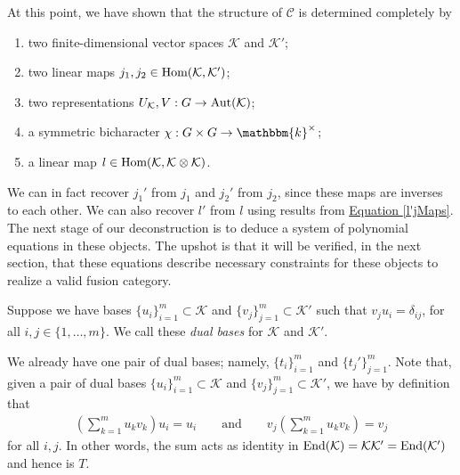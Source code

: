 \noindent At this point, we have shown that the structure of $\mathcal{C}$ is determined completely by
\begin{enumerate}[label=\textup{(\roman*).}, ref=\textup{(\roman*)}, leftmargin=4\parindent]
\item two finite-dimensional vector spaces $\mathcal{K}$ and $\mathcal{K}'$;
\item two linear maps $j_1, j_2 \in \textup{Hom}(\mathcal{K}, \mathcal{K}')$;
\item two representations $U_\mathcal{K}, V : G \to \textup{Aut}(\mathcal{K})$;
\item a symmetric bicharacter $\chi : G \times G \to \mathbbm{k}^\times$;
\item a linear map $l \in \textup{Hom}(\mathcal{K}, \mathcal{K} \otimes \mathcal{K})$.
\end{enumerate}
\noindent We can in fact recover $j_1'$ from $j_1$ and $j_2'$ from $j_2$, since these maps are inverses to each other. We can also recover $l'$ from $l$ using results from \hyperref[l'jMaps]{Equation \eqref*{l'jMaps}}. The next stage of our deconstruction is to deduce a system of polynomial equations in these objects. The upshot is that it will be verified, in the next section, that these equations describe necessary constraints for these objects to realize a valid fusion category.\\

\noindent\begin{definition}\label{DualBasis1} Suppose we have bases $\{u_i\}_{i=1}^m \subset \mathcal{K}$ and $\{v_j\}_{j=1}^m \subset \mathcal{K}'$ such that $v_ju_i = \delta_{ij}$, for all $i, j \in \{1, \dots, m\}$. We call these {\em dual bases} for $\mathcal{K}$ and $\mathcal{K}'$.\\
\end{definition}

\noindent We already have one pair of dual bases; namely, $\{t_i\}_{i=1}^m$ and $\{t_j'\}_{j=1}^m$. Note that, given a pair of dual bases $\{u_i\}_{i=1}^m \subset \mathcal{K}$ and $\{v_j\}_{j=1}^m \subset \mathcal{K}'$, we have by definition that
\begin{align*}
\left(\sum_{k=1}^m u_kv_k\right)u_i = u_i\qquad\text{and}\qquad v_j\left(\sum_{k=1}^m u_kv_k\right) = v_j
\end{align*}
\noindent for all $i, j$. In other words, the sum acts as identity in $\textup{End}(\mathcal{K}) = \mathcal{K}\mathcal{K}' = \textup{End}(\mathcal{K}')$ and hence is $T$.\\

